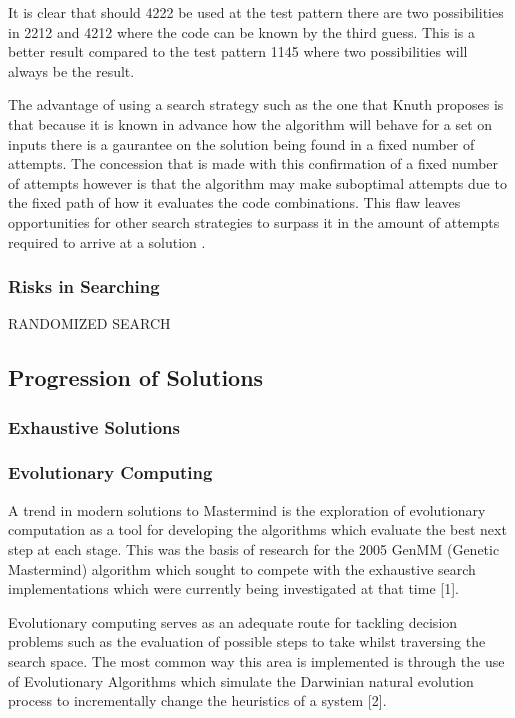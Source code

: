 \documentclass[11pt]{article}  %
\theoremstyle{definition}
\theoremstyle{remark}
\begin{document}
It is clear that should 4222 be used at the test pattern there are two possibilities in 2212 and 4212 where the code can be known by the third guess. This is a better result compared to the test pattern 1145 where two possibilities will always be the result.

The advantage of using a search strategy such as the one that Knuth proposes is that because it is known in advance how the algorithm will behave for a set on inputs there is a gaurantee on the solution being found in a fixed number of attempts. The concession that is made with this confirmation of a fixed number of attempts however is that the algorithm may make suboptimal attempts due to the fixed path of how it evaluates the code combinations. This flaw leaves opportunities for other search strategies to surpass it in the amount of attempts required to arrive at a solution \cite {Haystack}.

\subsubsection {Risks in Searching}

RANDOMIZED SEARCH

\subsection {Progression of Solutions}

\subsubsection {Exhaustive Solutions}

\subsubsection {Evolutionary Computing}
A trend in modern solutions to Mastermind is the exploration of evolutionary computation as a tool for developing the algorithms which evaluate the best next step at each stage. 
This was the basis of research for the 2005 GenMM (Genetic Mastermind) algorithm which sought to compete with the exhaustive search implementations which were currently being investigated at that time [1]. 

Evolutionary computing serves as an adequate route for tackling decision problems such as the evaluation of possible steps to take whilst traversing the search space. 
The most common way this area is implemented is through the use of Evolutionary Algorithms which simulate the Darwinian natural evolution process to incrementally change the heuristics of a system [2].
\end{document}
